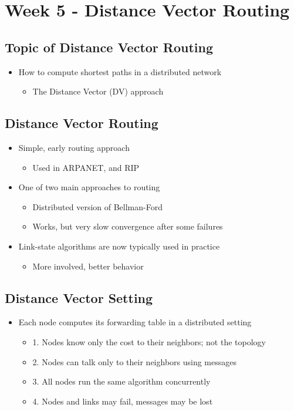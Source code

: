 \documentclass[12pt]{ctexart}   %
\begin{document}
\section{Week 5 - Distance Vector Routing}
	\subsection{Topic of Distance Vector Routing}
	\begin{itemize}
		\item How to compute shortest paths in a distributed network
		\begin{itemize}
			\item The Distance Vector (DV) approach
		\end{itemize}
	\end{itemize}
	
	\subsection{Distance Vector Routing}
	\begin{itemize}
		\item Simple, early routing approach
		\begin{itemize}
			\item Used in ARPANET, and RIP
		\end{itemize}
		
		\item One of two main approaches to routing
		\begin{itemize}
			\item Distributed version of Bellman-Ford
			\item Works, but very slow convergence after some failures
		\end{itemize}
		
		\item Link-state algorithms are now typically used in practice
		\begin{itemize}
			\item More involved, better behavior
		\end{itemize}
	\end{itemize}
	
	\subsection{Distance Vector Setting}
	\begin{itemize}
		\item Each node computes its forwarding table in a distributed setting
		\begin{itemize}
			\item {\color{blue} 1.} Nodes know only the cost to their neighbors; not the topology
			\item {\color{blue} 2.} Nodes can talk only to their neighbors using messages
			\item {\color{blue} 3.} All nodes run the same algorithm concurrently
			\item {\color{blue} 4.} Nodes and links may fail, messages may be lost   
		\end{itemize}
	\end{itemize}
	
\end{document}

